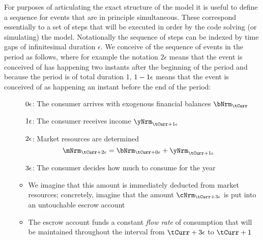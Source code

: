 \documentclass[./SolvingMicroDSOPs_TRP]{subfiles}
\begin{document}
For purposes of articulating the exact structure of the model it is useful to define a sequence for events that are in principle simultaneous.  These correspond essentially to a set of steps that will be executed in order by the code solving (or simulating) the model.  Notationally the sequence of steps can be indexed by time gaps of infinitesimal duration $\epsilon$.  We conceive of the sequence of events in the period as follows, where for example the notation $2\epsilon$ means that the event is conceived of has happening two instants after the beginning of the period and because the period is of total duration 1, $1-1\epsilon$ means that the event is conceived of as happening an instant before the end of the period:
\begin{enumerate}
\item[$\phantom{1-}0\epsilon$:] The consumer arrives with exogenous financial balances $\bNrm_{\tCurr}$

\item[$\phantom{1-}1\epsilon$:] The consumer receives income $\yNrm_{\tCurr+\receiveinc}$
\item[$\phantom{1-}2\epsilon$:] Market resources are determined
\begin{equation}
  \mNrm_{\tCurr+\calculatem} = \bNrm_{\tCurr+\beginWithb}+\yNrm_{\tCurr+\receiveinc}
\end{equation}

\item[$\phantom{1-}3\epsilon$:]  The consumer decides how much to consume for the year
  \begin{itemize}
    \item We imagine that this amount is immediately deducted from market resources; concretely, imagine that the amount $\cNrm_{\tCurr+\choosecons}$ is put into an untouchable escrow account
    \item The escrow account funds a constant \textit{flow rate} of consumption that will be maintained throughout the interval from $\tCurr+\choosecons$ to $\tCurr+1$


\end{itemize}
\end{enumerate}
\end{document}
